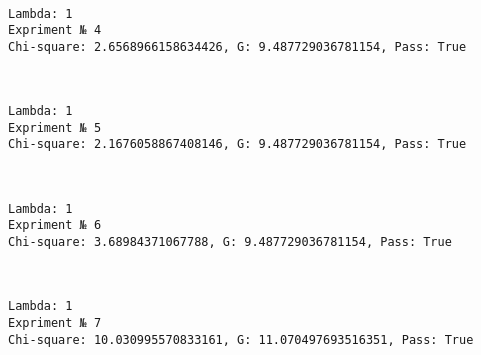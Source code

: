 \documentclass[11pt]{article}
\begin{document}
    \begin{center}
    \end{center}
    { \hspace*{\fill} \\}
    
    \begin{Verbatim}[commandchars=\\\{\}]
Lambda: 1
Expriment № 4
Chi-square: 2.6568966158634426, G: 9.487729036781154, Pass: True
    \end{Verbatim}

    \begin{center}
    \end{center}
    { \hspace*{\fill} \\}
    
    \begin{Verbatim}[commandchars=\\\{\}]
Lambda: 1
Expriment № 5
Chi-square: 2.1676058867408146, G: 9.487729036781154, Pass: True
    \end{Verbatim}

    \begin{center}
    \end{center}
    { \hspace*{\fill} \\}
    
    \begin{Verbatim}[commandchars=\\\{\}]
Lambda: 1
Expriment № 6
Chi-square: 3.68984371067788, G: 9.487729036781154, Pass: True
    \end{Verbatim}

    \begin{center}
    \end{center}
    { \hspace*{\fill} \\}
    
    \begin{Verbatim}[commandchars=\\\{\}]
Lambda: 1
Expriment № 7
Chi-square: 10.030995570833161, G: 11.070497693516351, Pass: True
    \end{Verbatim}
\end{document}
